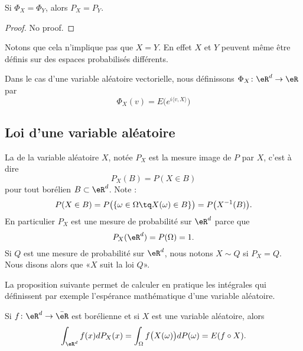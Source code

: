 \begin{theorem}
    Si \( \Phi_X=\Phi_Y\), alors \( P_X=P_Y\).
\end{theorem}
\begin{proof}
    No proof.
\end{proof}
Notons que cela n'implique pas que \( X=Y\). En effet \( X\) et \( Y\) peuvent même être définis sur des espaces probabilisés différents.

Dans le cas d'une variable aléatoire vectorielle, nous définissons \( \Phi_X\colon \eR^d\to \eR\) par
\begin{equation}
    \Phi_X(v)=E\big(  e^{i\langle v, X\rangle } \big)
\end{equation}
\subsection{Loi d'une variable aléatoire}

La  de la variable aléatoire \( X\), notée \( P_X\) est la mesure image de \( P\) par \( X\), c'est à dire
\begin{equation}
    P_X(B)=P(X\in B)
\end{equation}
pour tout borélien \( B\subset\eR^d\). Note :
\begin{equation}
    P(X\in B)=P\big( \{ \omega\in\Omega\tq X(\omega)\in B \} \big)=P\big( X^{-1}(B) \big).
\end{equation}
En particulier \( P_X\) est une mesure de probabilité sur \( \eR^d\) parce que 
\begin{equation}
    P_X(\eR^d)=P(\Omega)=1.
\end{equation}
Si \( Q\) est une mesure de probabilité sur \( \eR^d\), nous notons \( X\sim Q\) si \( P_X=Q\). Nous disons alors que «\( X\) suit la loi \( Q\)».

La proposition suivante permet de calculer en pratique les intégrales qui définissent par exemple l'espérance mathématique d'une variable aléatoire.
\begin{proposition}     \label{PropintdPintdPXeR}
    Si \( f\colon \eR^d\to \bar\eR\) est borélienne et si \( X\) est une variable aléatoire, alors
    \begin{equation}
        \int_{\eR^d}f(x)dP_X(x)=\int_{\Omega}f\big( X(\omega) \big)dP(\omega)=E(f\circ X).
    \end{equation}
\end{proposition}

